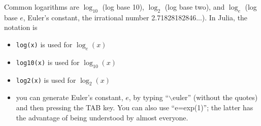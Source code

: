 Common logarithms are $\log_{10}$ (log base 10), $\log_2$ (log base two), and $\log_e$ (log base $e$, Euler's constant, the irrational number 2.71828182846...). In Julia, the notation is
\begin{itemize}
    \item \texttt{log(x)} is used for $\log_e(x)$
    \item \texttt{log10(x)} is used for $\log_{10}(x)$
    \item \texttt{log2(x)} is used for $\log_{2}(x)$
    \item you can generate Euler's constant, $e$, by typing ``$\backslash$euler'' (without the quotes) and then pressing the TAB key. You can also use ``e=exp(1)''; the latter has the advantage of being understood by almost everyone. 
\end{itemize}

\bigskip

